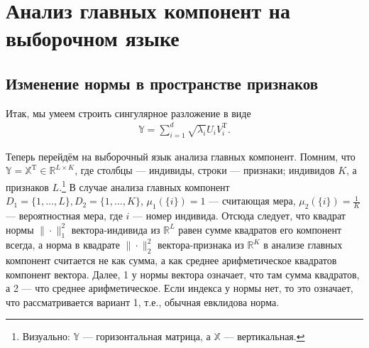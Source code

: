 \documentclass[specialist, 12pt,
subf, %
href, colorlinks=true,
substylefile = spbu.rtx,
]{disser}
\newtheorem{remark}{Замечание}
\begin{document}
%
%
%
%
\section{Анализ главных компонент на выборочном языке}
\subsection{Изменение нормы в пространстве признаков}
Итак, мы умеем строить сингулярное разложение в виде
\begin{gather*}
\mathbb{Y} = \sum\limits_{i = 1}^d \sqrt{\lambda_i} U_i V_i^{\mathrm{T}}.
\end{gather*}

Теперь перейдём на выборочный язык анализа главных компонент.
Помним, что $\mathbb{Y} = \mathbb{X}^{\mathrm{T}}\in \mathbb{R}^{L\times K}$, где столбцы --- индивиды, строки --- признаки; индивидов $K$, а признаков $L$.\footnote{Визуально: $\mathbb{Y}$ --- горизонтальная матрица, а $\mathbb{X}$ --- вертикальная.} В случае анализа главных компонент
$D_1 = \{1, \ldots, L\}, D_2 = \{1, \ldots, K\}$, $\mu_1(\{i\}) = 1$ --- считающая мера,  $\mu_2(\{i\}) = \frac{1}{K}$  --- вероятностная мера, где $i$ --- номер индивида. Отсюда следует, что квадрат нормы $\|\cdot\|_1^2$ вектора-индивида из $\mathbb{R}^{L}$ равен сумме квадратов его компонент всегда, а норма в квадрате $\|\cdot\|_2^2$ вектора-признака из $\mathbb{R}^{K}$ в анализе главных компонент считается не как сумма, а как среднее арифметическое квадратов компонент вектора. Далее, 1 у нормы вектора означает, что там сумма квадратов,
а 2 --- что среднее арифметическое. Если индекса у нормы нет, то это означает, что рассматривается вариант 1,
т.е., обычная евклидова норма.
\end{document}
